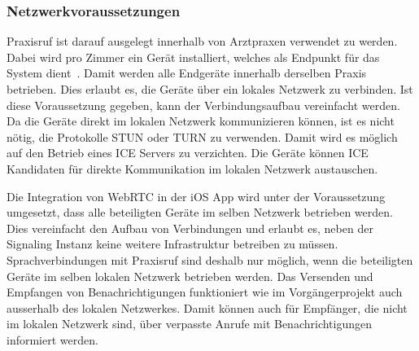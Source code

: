 \subsubsection{Netzwerkvoraussetzungen}

Praxisruf ist darauf ausgelegt innerhalb von Arztpraxen verwendet zu werden.
Dabei wird pro Zimmer ein Gerät installiert, welches als Endpunkt für das System dient~\cite{aufgabenstellung}.
Damit werden alle Endgeräte innerhalb derselben Praxis betrieben.
Dies erlaubt es, die Geräte über ein lokales Netzwerk zu verbinden.
Ist diese Voraussetzung gegeben, kann der Verbindungsaufbau vereinfacht werden.
Da die Geräte direkt im lokalen Netzwerk kommunizieren können, ist es nicht nötig, die Protokolle STUN oder TURN zu verwenden.
Damit wird es möglich auf den Betrieb eines ICE Servers zu verzichten.
Die Geräte können ICE Kandidaten für direkte Kommunikation im lokalen Netzwerk austauschen.

Die Integration von WebRTC in der iOS App wird unter der Voraussetzung umgesetzt, dass alle beteiligten Geräte im selben Netzwerk betrieben werden.
Dies vereinfacht den Aufbau von Verbindungen und erlaubt es, neben der Signaling Instanz keine weitere Infrastruktur betreiben zu müssen.
Sprachverbindungen mit Praxisruf sind deshalb nur möglich, wenn die beteiligten Geräte im selben lokalen Netzwerk betrieben werden.
Das Versenden und Empfangen von Benachrichtigungen funktioniert wie im Vorgängerprojekt auch ausserhalb des lokalen Netzwerkes.
Damit können auch für Empfänger, die nicht im lokalen Netzwerk sind, über verpasste Anrufe mit Benachrichtigungen informiert werden.

\clearpage
